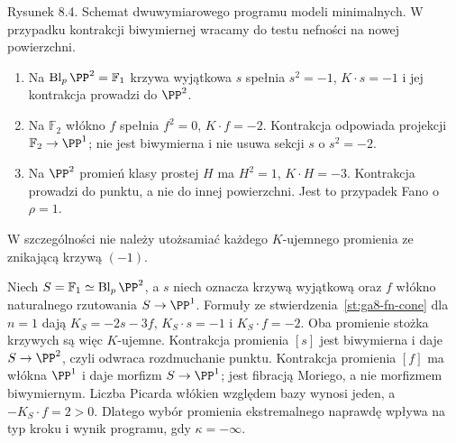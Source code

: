 \begin{center}

{\small Rysunek 8.4. Schemat dwuwymiarowego programu modeli
minimalnych. W przypadku kontrakcji biwymiernej
wracamy do testu nefności na nowej powierzchni.}\par
\end{center}

\begin{przyklad}
\label{prz:ga8-extremal-examples}
\begin{enumerate}[label=(\roman*)]
\item Na $\operatorname{Bl}_p\PP^2=\mathbb F_1$
krzywa wyjątkowa $s$ spełnia $s^2=-1$,
$K\cdot s=-1$ i jej kontrakcja prowadzi do $\PP^2$.
\item Na $\mathbb F_2$ włókno $f$ spełnia
$f^2=0$, $K\cdot f=-2$. Kontrakcja odpowiada
projekcji $\mathbb F_2\to\PP^1$; nie jest
biwymierna i nie usuwa sekcji $s$ o $s^2=-2$.
\item Na $\PP^2$ promień klasy prostej $H$
ma $H^2=1$, $K\cdot H=-3$.
Kontrakcja prowadzi do punktu, a nie do innej
powierzchni. Jest to przypadek Fano o $\rho=1$.
\end{enumerate}
W szczególności nie należy utożsamiać każdego
$K$-ujemnego promienia ze znikającą krzywą $(-1)$.
\end{przyklad}

\begin{przyklad}
\label{prz:ga8-f1-two-rays}
Niech $S=\mathbb F_1\simeq\operatorname{Bl}_p\PP^2$, a $s$
niech oznacza krzywą wyjątkową oraz $f$ włókno
naturalnego rzutowania $S\to\PP^1$. Formuły
ze stwierdzenia~\ref{st:ga8-fn-cone} dla $n=1$ dają
$K_S=-2s-3f$, $K_S\cdot s=-1$ i $K_S\cdot f=-2$.
Oba promienie stożka krzywych są więc $K$-ujemne.
Kontrakcja promienia $[s]$ jest biwymierna i daje
$S\to\PP^2$, czyli odwraca rozdmuchanie punktu.
Kontrakcja promienia $[f]$ ma włókna $\PP^1$
i daje morfizm $S\to\PP^1$; jest fibracją Moriego,
a nie morfizmem biwymiernym. Liczba Picarda włókien
względem bazy wynosi jeden, a $-K_S\cdot f=2>0$.
Dlatego wybór promienia ekstremalnego naprawdę wpływa
na typ kroku i wynik programu, gdy $\kappa=-\infty$.
\end{przyklad}

